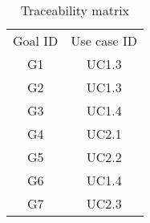 \begin{table}[t]
    \caption{Traceability matrix}
    \label{tab:traceability}
    \centering\sffamily
    \begin{tabu} to \linewidth {c c}
        \toprule
        \rowfont{\bfseries}
        Goal ID & Use case ID \\
        G1 & UC1.3 \\
        G2 & UC1.3 \\
        G3 & UC1.4 \\
        G4 & UC2.1 \\
        G5 & UC2.2 \\
        G6 & UC1.4 \\
        G7 & UC2.3 \\
        \bottomrule
    \end{tabu}
\end{table}